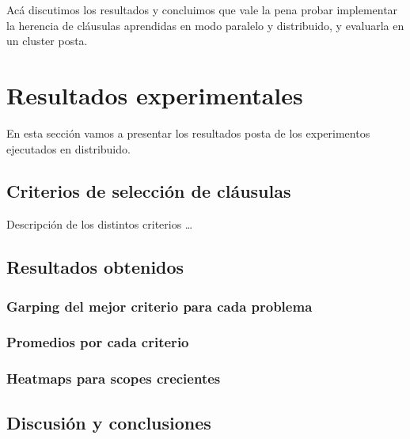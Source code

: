 Acá discutimos los resultados y concluimos que vale la pena probar implementar la herencia de cláusulas aprendidas en modo paralelo y distribuido, y evaluarla en un cluster posta.


\section{Resultados experimentales}

En esta sección vamos a presentar los resultados posta de los experimentos ejecutados en distribuido.

\subsection{Criterios de selección de cláusulas}

Descripción de los distintos criterios \ldots

\subsection{Resultados obtenidos}

\subsubsection{Garping del mejor criterio para cada problema}

\subsubsection{Promedios por cada criterio}

\subsubsection{Heatmaps para scopes crecientes}


\subsection{Discusión y conclusiones}


\newpage


